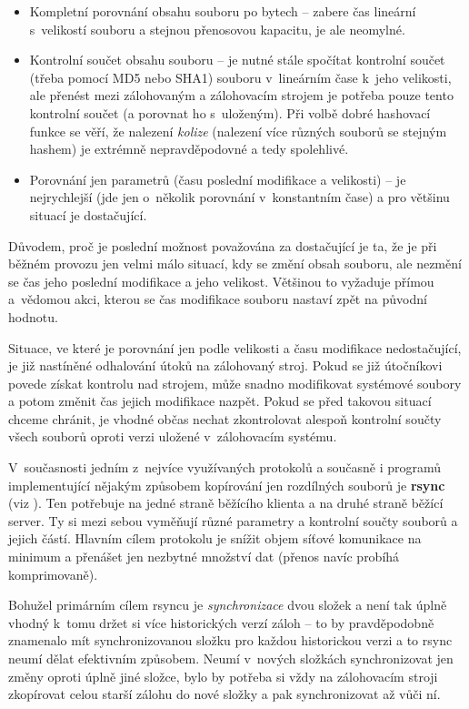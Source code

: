\begin{itemize}
	\item Kompletní porovnání obsahu souboru po bytech -- zabere čas lineární
	s~velikostí souboru a stejnou přenosovou kapacitu, je ale neomylné.
	\item Kontrolní součet obsahu souboru -- je nutné stále spočítat kontrolní
	součet (třeba pomocí \gls{MD5} nebo \gls{SHA1}) souboru v~lineárním čase
	k~jeho velikosti, ale přenést mezi zálohovaným a zálohovacím strojem je
	potřeba pouze tento kontrolní součet (a porovnat ho s~uloženým). Při volbě
	dobré hashovací funkce se věří, že nalezení {\it kolize} (nalezení více
	různých souborů se stejným hashem) je extrémně nepravděpodovné a tedy
	spolehlivé.
	\item Porovnání jen parametrů (času poslední modifikace a velikosti) --
	je nejrychlejší (jde jen o~několik porovnání v~konstantním čase) a pro
	většinu situací je dostačující.
\end{itemize}

Důvodem, proč je poslední možnost považována za dostačující je ta, že je při
běžném provozu jen velmi málo situací, kdy se změní obsah souboru, ale nezmění
se čas jeho poslední modifikace a jeho velikost. Většinou to vyžaduje přímou
a~vědomou akci, kterou se čas modifikace souboru nastaví zpět na původní
hodnotu.

Situace, ve které je porovnání jen podle velikosti a času modifikace
nedostačující, je již nastíněné odhalování útoků na zálohovaný stroj. Pokud se
již útočníkovi povede získat kontrolu nad strojem, může snadno modifikovat
systémové soubory a potom změnit čas jejich modifikace nazpět. Pokud se před
takovou situací chceme chránit, je vhodné občas nechat zkontrolovat alespoň
kontrolní součty všech souborů oproti verzi uložené v~zálohovacím systému.

V~současnosti jedním z~nejvíce využívaných protokolů a současně i programů
implementující nějakým způsobem kopírování jen rozdílných souborů je {\bf rsync}
(viz \cite{rsync}). Ten potřebuje na jedné straně běžícího klienta a na druhé
straně běžící server. Ty si mezi sebou vyměňují různé parametry a kontrolní
součty souborů a jejich částí. Hlavním cílem protokolu je snížit objem síťové
komunikace na minimum a přenášet jen nezbytné množství dat (přenos navíc probíhá
komprimovaně).

Bohužel primárním cílem rsyncu je {\it synchronizace} dvou složek a není tak
úplně vhodný k~tomu držet si více historických verzí záloh -- to by pravděpodobně
znamenalo mít synchronizovanou složku pro každou historickou verzi a to rsync
neumí dělat efektivním způsobem. Neumí v~nových složkách synchronizovat jen
změny oproti úplně jiné složce, bylo by potřeba si vždy na zálohovacím stroji
zkopírovat celou starší zálohu do nové složky a pak synchronizovat až vůči ní.

